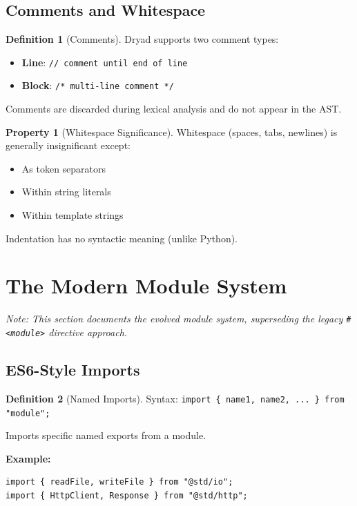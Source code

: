 \documentclass[12pt,a4paper]{article}
\theoremstyle{definition}
\newtheorem{definition}{Definition}[section]
\newtheorem{property}{Property}[section]
\begin{document}
\subsection{Comments and Whitespace}

\begin{definition}[Comments]
Dryad supports two comment types:
\begin{itemize}[leftmargin=*]
    \item \textbf{Line}: \texttt{// comment until end of line}
    \item \textbf{Block}: \texttt{/* multi-line comment */}
\end{itemize}
Comments are discarded during lexical analysis and do not appear in the AST.
\end{definition}

\begin{property}[Whitespace Significance]
Whitespace (spaces, tabs, newlines) is generally insignificant except:
\begin{itemize}[leftmargin=*]
    \item As token separators
    \item Within string literals
    \item Within template strings
\end{itemize}
Indentation has no syntactic meaning (unlike Python).
\end{property}

\newpage

\section{The Modern Module System}

\textit{Note: This section documents the evolved module system, superseding the legacy \texttt{\#<module>} directive approach.}

\subsection{ES6-Style Imports}

\begin{definition}[Named Imports]
Syntax: \texttt{import \{ name1, name2, ... \} from "module";}

Imports specific named exports from a module.

\textbf{Example:}
\begin{lstlisting}[language=Dryad]
import { readFile, writeFile } from "@std/io";
import { HttpClient, Response } from "@std/http";
\end{lstlisting}
\end{definition}
\end{document}
